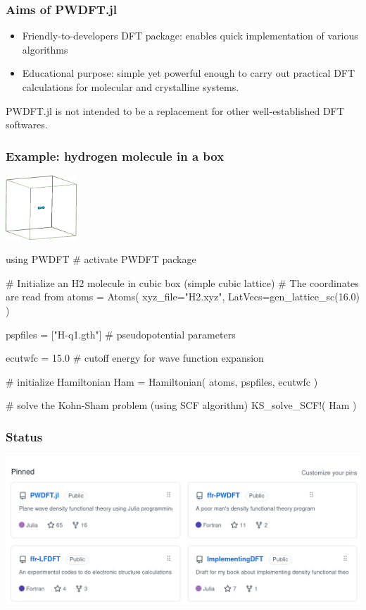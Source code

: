 \begin{frame}
\frametitle{Aims of PWDFT.jl}

\begin{itemize}
\item Friendly-to-developers DFT package: enables quick implementation of various algorithms
\item Educational purpose: simple yet powerful enough to carry out practical DFT calculations
for molecular and crystalline systems.
\end{itemize}

\textsf{PWDFT.jl} is not intended to be a replacement for other well-established
DFT softwares.

\end{frame}

\begin{frame}[fragile]
\frametitle{Example: hydrogen molecule in a box}

{\centering
\includegraphics[width=0.20\textwidth]{images/H2.png}
\par}

\begin{juliacode}
using PWDFT # activate PWDFT package

# Initialize an H2 molecule in cubic box (simple cubic lattice)
# The coordinates are read from
atoms = Atoms( xyz_file="H2.xyz",
               LatVecs=gen_lattice_sc(16.0) )

pspfiles = ["H-q1.gth"] # pseudopotential parameters

ecutwfc = 15.0 # cutoff energy for wave function expansion

# initialize Hamiltonian
Ham = Hamiltonian( atoms, pspfiles, ecutwfc )

# solve the Kohn-Sham problem (using SCF algorithm)
KS_solve_SCF!( Ham )
\end{juliacode}

\end{frame}



\begin{frame}
\frametitle{Status}
  
{\centering
\includegraphics[width=\textwidth]{images/Github_ffr.png}
\par}

\end{frame}



